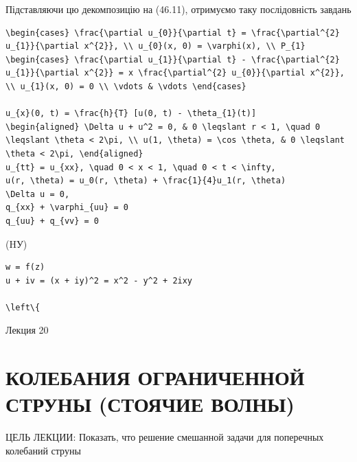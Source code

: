 \documentclass[
  ukrainian,
]{article}
\begin{document}
Підставляючи цю декомпозицію на (46.11), отримуємо таку послідовність
завдань

\begin{verbatim}
\begin{cases} \frac{\partial u_{0}}{\partial t} = \frac{\partial^{2} u_{1}}{\partial x^{2}}, \\ u_{0}(x, 0) = \varphi(x), \\ P_{1} \begin{cases} \frac{\partial u_{1}}{\partial t} - \frac{\partial^{2} u_{1}}{\partial x^{2}} = x \frac{\partial^{2} u_{0}}{\partial x^{2}}, \\ u_{1}(x, 0) = 0 \\ \vdots & \vdots \end{cases}

u_{x}(0, t) = \frac{h}{T} [u(0, t) - \theta_{1}(t)]
\begin{aligned} \Delta u + u^2 = 0, & 0 \leqslant r < 1, \quad 0 \leqslant \theta < 2\pi, \\ u(1, \theta) = \cos \theta, & 0 \leqslant \theta < 2\pi, \end{aligned}
u_{tt} = u_{xx}, \quad 0 < x < 1, \quad 0 < t < \infty,
u(r, \theta) = u_0(r, \theta) + \frac{1}{4}u_1(r, \theta)
\Delta u = 0,
q_{xx} + \varphi_{uu} = 0
q_{uu} + q_{vv} = 0
\end{verbatim}

(HУ)

\begin{verbatim}
w = f(z)
u + iv = (x + iy)^2 = x^2 - y^2 + 2ixy

\left\{
\end{verbatim}

Лекция 20

\section{КОЛЕБАНИЯ ОГРАНИЧЕННОЙ СТРУНЫ (СТОЯЧИЕ
ВОЛНЫ)}\label{ux43aux43eux43bux435ux431ux430ux43dux438ux44f-ux43eux433ux440ux430ux43dux438ux447ux435ux43dux43dux43eux439-ux441ux442ux440ux443ux43dux44b-ux441ux442ux43eux44fux447ux438ux435-ux432ux43eux43bux43dux44b}

ЦЕЛЬ ЛЕКЦИИ: Показать, что решение смешанной задачи для поперечных
колебаний струны
\end{document}
